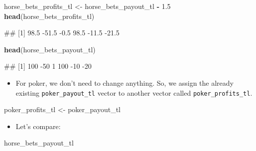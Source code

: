 \documentclass[
]{book}
\newenvironment{Shaded}{\begin{snugshade}}{\end{snugshade}}
\newcommand{\FloatTok}[1]{\textcolor[rgb]{0.00,0.00,0.81}{#1}}
\newcommand{\FunctionTok}[1]{\textcolor[rgb]{0.13,0.29,0.53}{\textbf{#1}}}
\newcommand{\NormalTok}[1]{#1}
\newcommand{\OtherTok}[1]{\textcolor[rgb]{0.56,0.35,0.01}{#1}}
\newcommand{\SpecialCharTok}[1]{\textcolor[rgb]{0.81,0.36,0.00}{\textbf{#1}}}
\providecommand{\tightlist}{%
  \setlength{\itemsep}{0pt}\setlength{\parskip}{0pt}}
\begin{document}
\begin{Shaded}
\begin{Highlighting}[]
\NormalTok{horse\_bets\_profits\_tl }\OtherTok{\textless{}{-}}\NormalTok{ horse\_bets\_payout\_tl }\SpecialCharTok{{-}} \FloatTok{1.5}
\FunctionTok{head}\NormalTok{(horse\_bets\_profits\_tl)}
\end{Highlighting}
\end{Shaded}

\begin{Shaded}
\begin{Highlighting}[]
\NormalTok{\#\# [1]  98.5 {-}51.5  {-}0.5  98.5 {-}11.5 {-}21.5}
\end{Highlighting}
\end{Shaded}

\begin{Shaded}
\begin{Highlighting}[]
\FunctionTok{head}\NormalTok{(horse\_bets\_payout\_tl)}
\end{Highlighting}
\end{Shaded}

\begin{Shaded}
\begin{Highlighting}[]
\NormalTok{\#\# [1] 100 {-}50   1 100 {-}10 {-}20}
\end{Highlighting}
\end{Shaded}

\begin{itemize}
\tightlist
\item
  For poker, we don't need to change anything. So, we assign the already existing \texttt{poker\_payout\_tl} vector to another vector called \texttt{poker\_profits\_tl}.
\end{itemize}

\begin{Shaded}
\begin{Highlighting}[]
\NormalTok{poker\_profits\_tl }\OtherTok{\textless{}{-}}\NormalTok{ poker\_payout\_tl}
\end{Highlighting}
\end{Shaded}

\begin{itemize}
\tightlist
\item
  Let's compare:
\end{itemize}

\begin{Shaded}
\begin{Highlighting}[]
\NormalTok{horse\_bets\_payout\_tl}
\end{Highlighting}
\end{Shaded}
\end{document}
